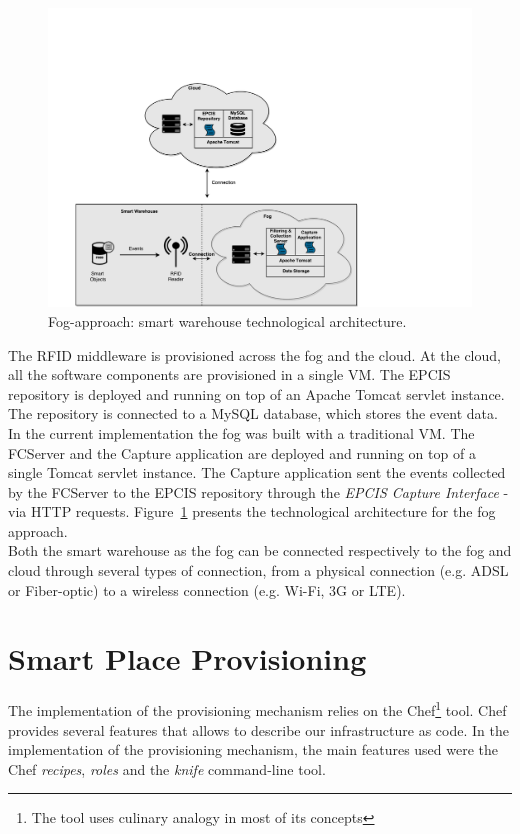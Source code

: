 \begin{figure}
  \centering
  \includegraphics[width=\textwidth]{./images/implementation_fog_architecture}
  \caption[Fog-approach: technological architecture.]{Fog-approach: smart warehouse technological architecture.}
  \label{fig:implementation_fog_architecture}
\end{figure}

The \gls{RFID} middleware is provisioned across the fog and the cloud. At the cloud,
all the software components are provisioned in a single \gls{VM}. The \gls{EPCIS} repository is deployed
and running on top of an Apache Tomcat servlet instance. The repository is connected to a MySQL
database, which stores the event data. In the current implementation the fog was built with a traditional
\gls{VM}. The \gls{FCServer} and the Capture application are deployed and running on top of a single
Tomcat servlet instance. The Capture application sent the events collected by the \gls{FCServer} to
the \gls{EPCIS} repository through the \textit{\gls{EPCIS} Capture Interface} - via \gls{HTTP} requests.
Figure~\ref{fig:implementation_fog_architecture} presents the technological architecture for the fog
approach.\\

Both the smart warehouse as the fog can be connected respectively to the fog and cloud through several
types of connection, from a physical connection (e.g. \gls{ADSL} or Fiber-optic) to a wireless connection
(e.g. Wi-Fi, 3G or \gls{LTE}).

\section{Smart Place Provisioning}
\label{sec:impl_provisioning}
The implementation of the provisioning mechanism relies on the Chef\footnote{The tool uses culinary
analogy in most of its concepts} tool. Chef provides several features that allows to describe our
infrastructure as code. In the implementation of the provisioning mechanism, the main features used
were the Chef \textit{recipes}, \textit{roles} and the \textit{knife} command-line tool.

